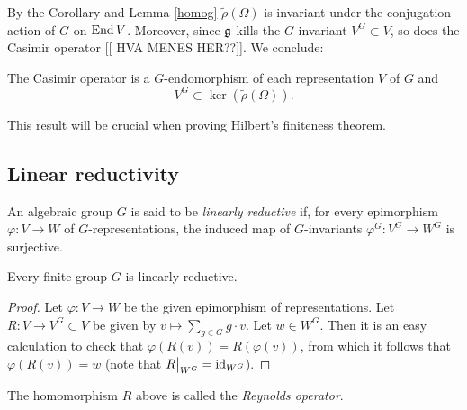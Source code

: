 \documentclass[11pt, english]{article}
\begin{document}
By the Corollary and Lemma \ref{homog}  $\tilde \rho(\Omega)$ is invariant under the conjugation action of $G$ on $\operatorname{End} V$. Moreover, since $\mathfrak g$ kills the $G$-invariant $V^G \subset V$, so does the Casimir operator [[ HVA MENES HER??]]. We conclude:

\begin{corr}
\label{korrker}
The Casimir operator is a $G$-endomorphism of each representation $V$ of $G$ and
$$
V^G \subset \ker ( \tilde \rho(\Omega)).
$$
\end{corr}

This result will be crucial when proving Hilbert's finiteness theorem.

\subsection{Linear reductivity}

\begin{defi}
An algebraic group $G$ is said to be \emph{linearly reductive} if, for every epimorphism $\varphi:V \to W$ of $G$-representations, the induced map of $G$-invariants $\varphi^G:V^G \to W^G$ is surjective.
\end{defi}

\begin{prop}
Every finite group $G$ is linearly reductive.
\end{prop}

\begin{proof}
Let $\varphi: V \to W$ be the given epimorphism of representations. Let $ R:V \to V^G \subset V$ be given by $v \mapsto \sum_{g \in G} g\cdot v$. Let $w \in W^G$. Then it is an easy calculation to check that $\varphi(R(v))=R(\varphi(v))$, from which it follows that $\varphi(R(v))=w$ (note that $\restr{R}{W^G}=\id_{W^G}$).
\end{proof}

The homomorphism $R$ above is called the \emph{Reynolds operator}.
\end{document}
